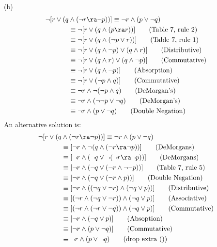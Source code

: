 \begin{questions}
\begin{solution}
    (b)
    \begin{align*} 
      \neg [ r \vee (q & \wedge (\neg r \ra \neg p))] \equiv \neg r \wedge (p \vee \neg q) \\
        & \equiv \neg [r \vee (q \wedge (p \ra r))] \tag{Table 7, rule 2} \\
        & \equiv \neg [r \vee (q \wedge (\neg p \vee r))] \tag{Table 7, rule 1} \\
        & \equiv \neg [r \vee (q \wedge \neg p) \vee (q \wedge r)] \tag{Distributive} \\
        & \equiv \neg [r \vee (q \wedge r) \vee (q \wedge \neg p)] \tag{Commutative} \\
        & \equiv \neg [r \vee (q \wedge \neg p)] \tag{Absorption} \\
        & \equiv \neg [r \vee (\neg p \wedge q)] \tag{Commutative} \\
        & \equiv \neg r \wedge \neg (\neg p \wedge q) \tag{DeMorgan's} \\
        & \equiv \neg r \wedge (\neg \neg p \vee \neg q) \tag{DeMorgan's} \\
        & \equiv \neg r \wedge (p \vee \neg q) \tag{Double Negation} 
    \end{align*}
An alternative solution is:
    \begin{align*} 
      \neg [ r \vee (q & \wedge (\neg r \ra \neg p))] \equiv \neg r \wedge (p \vee \neg q) \\
      & \equiv [\neg r \wedge \neg (q  \wedge (\neg r \ra \neg p))] \tag{DeMorgans} \\
      & \equiv [\neg r \wedge (\neg q \vee \neg (\neg r \ra \neg p))] \tag{DeMorgans} \\
      & \equiv [\neg r \wedge (\neg q \vee (\neg r \wedge \neg \neg p))] \tag{Table 7, rule 5} \\
      & \equiv [\neg r \wedge (\neg q \vee (\neg r \wedge p))] \tag{Double Negation} \\
      & \equiv [\neg r \wedge ((\neg q \vee \neg r) \wedge (\neg q \vee p))] \tag{Distributive} \\
      & \equiv [(\neg r \wedge (\neg q \vee \neg r)) \wedge (\neg q \vee p)] \tag{Associative} \\
      & \equiv [(\neg r \wedge (\neg r \vee \neg q)) \wedge (\neg q \vee p)] \tag{Commutative} \\
      & \equiv [\neg r \wedge (\neg q \vee p)] \tag{Absoption} \\
      & \equiv [\neg r \wedge (p \vee \neg q)] \tag{Commutative} \\
      & \equiv \neg r \wedge (p \vee \neg q) \tag{drop extra ()}
    \end{align*}


\end{solution}
\end{questions}
